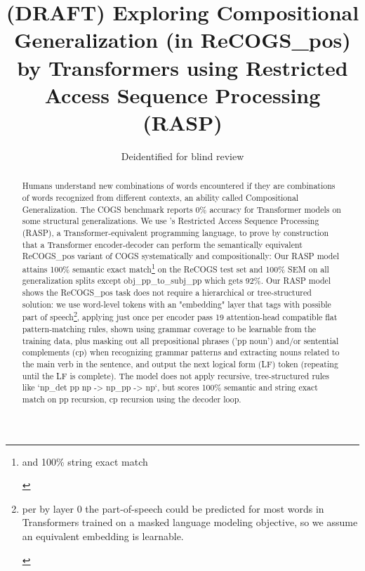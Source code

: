 \documentclass[11pt]{article}
\title{(DRAFT) Exploring Compositional Generalization (in ReCOGS\_pos) by Transformers using Restricted Access Sequence Processing (RASP)}
\author{Deidentified for blind review}
\begin{document}
\maketitle
\begin{abstract}
Humans understand new combinations of words encountered if they are combinations of words recognized from different contexts, an ability called Compositional Generalization.
The COGS benchmark \cite{KimLinzen2020} reports 0\% accuracy for Transformer models on some structural generalizations.
We use \cite{Weiss2021}'s Restricted Access Sequence Processing (RASP), a Transformer-equivalent programming language, to prove by construction that a Transformer encoder-decoder
can perform the semantically equivalent ReCOGS\_pos
\cite{Wu2023} variant of COGS systematically and compositionally: Our RASP model attains 100\% semantic exact match\footnote{\begin{footnotesize}and 100\% string exact match\end{footnotesize}} on the ReCOGS test set and 100\% SEM on all generalization splits except obj\_pp\_to\_subj\_pp which gets 92\%. Our RASP model shows the ReCOGS\_pos task does not require a hierarchical or tree-structured solution: we use word-level tokens with an "embedding" layer that tags with possible part of speech\footnote{\begin{footnotesize}per \cite{tenney2019bertrediscoversclassicalnlp} by layer 0 the part-of-speech could be predicted for most words in Transformers trained on a masked language modeling objective, so we assume an equivalent embedding is learnable.\end{footnotesize}}, applying just once per encoder pass 19 attention-head compatible flat pattern-matching rules, shown using grammar coverage \cite{fuzzingbook2023:GrammarCoverageFuzzer} to be learnable from the training data, plus masking out all prepositional phrases ('pp noun') and/or sentential complements (cp) when recognizing grammar patterns and extracting nouns related to the main verb in the sentence, and output the next logical form (LF) token (repeating until the LF is complete). The model does not apply recursive, tree-structured rules like `np\_det pp np -> np\_pp -> np`, but scores 100\% semantic and string exact match on pp recursion, cp recursion using the decoder loop.

\end{abstract}
\end{document}
